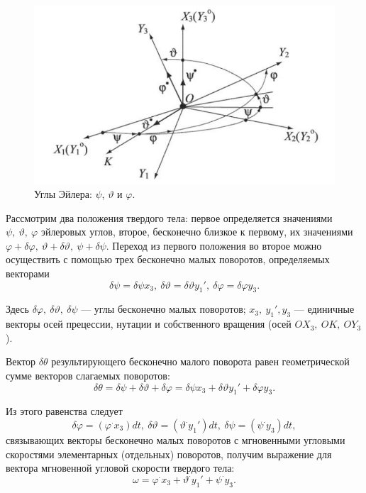\documentclass[14pt]{extreport}
\renewcommand{\phi}{\varphi} %
\begin{document}
\begin{figure}[H]
\center\includegraphics[scale=0.5]{fig/img12.png}
\caption{Углы Эйлера: $\psi$, $\vartheta$ и $\phi$.}
\end{figure}

Рассмотрим два положения твердого тела: первое определяется значениями $\psi,\ \vartheta,\ \phi$ эйлеровых углов, второе, бесконечно близкое к первому, их значениями $\phi+\delta\phi,\ \vartheta+\delta\vartheta,\ \psi+\delta\psi$. Переход из первого положения во второе можно осуществить с помощью трех бесконечно малых поворотов, определяемых векторами
\begin{equation}
\delta\psi=\delta\psi x_{3},\ \delta\vartheta=\delta\vartheta y_{1}',\ \delta\phi=\delta\phi y_{3}.
\end{equation}

Здесь $\delta\phi,\ \delta\vartheta,\ \delta\psi$ — углы бесконечно малых поворотов; $x_{3},\ y_{1}', y_{3}$ — единичные векторы осей прецессии, нутации и собственного вращения (осей $OX_{3},\ OK,\ OY_{3}$).

Вектор $\delta\theta$ результирующего бесконечно малого поворота равен гео­метрической сумме векторов слагаемых поворотов:
\begin{equation}
\delta\theta=\delta\psi+\delta\vartheta+\delta\phi=\delta\psi x_{3}+\delta\vartheta y_{1}'+\delta\phi y_{3}.
\end{equation}

Из этого равенства следует
\begin{equation}
\delta\phi=(\phi^{\cdot} x_{3})dt,\ \delta\vartheta=(\vartheta^{\cdot} y_{1}')dt,\ \delta\psi=(\psi^{\cdot} y_{3})dt,
\end{equation}
связывающих векторы бесконечно малых поворотов с мгновенными угловыми скоростями элементарных (отдельных) поворотов, получим выражение для вектора мгновенной угловой скорости твердого тела:
\begin{equation}
\label{res-omega}
\omega=\phi^{\cdot} x_{3}+\vartheta^{\cdot} y_{1}'+\psi^{\cdot} y_{3}.
\end{equation}
\end{document}
